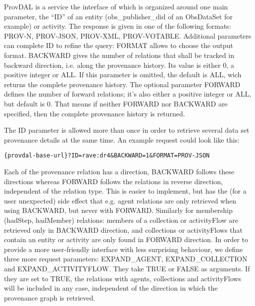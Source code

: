 ProvDAL is a service the interface of which is organized around one main parameter, the ``ID'' of an entity (obs\_publisher\_did of an ObsDataSet for example) or activity. The response is given in one of the following formats: PROV-N, PROV-JSON, PROV-XML, PROV-VOTABLE. Additional parameters can complete ID to refine the query: FORMAT allows to choose the output format. BACKWARD gives the number of relations that shall be tracked in backward direction, i.e. along the provenance history. Its value is either 0, a positive integer or ALL. If this parameter is omitted, the default is ALL, wich returns the complete provenance history.
The optional parameter FORWARD defines the number of forward relations; it's also either a positive integer or ALL, but default is 0. That means if neither FORWARD nor BACKWARD are specified, then the complete provenance history is returned.



The ID parameter is allowed more than once in order to retrieve several data set provenance details at the same time. An example request could look like this:

\begin{verbatim}
{provdal-base-url}?ID=rave:dr4&BACKWARD=1&FORMAT=PROV-JSON
\end{verbatim}

Each of the provenance relation has a direction, BACKWARD follows these directions whereas FORWARD follows the relations in reverse direction, independent of the relation type. This is easier to implement, but has the (for a user unexpected) side effect that e.g. agent relations are only retrieved when using BACKWARD, but never with FORWARD. Similarly for membership (hadStep, hadMember) relations: members of a collection or activityFlow are retrieved only in BACKWARD direction, and collections or activityFlows that contain an entity or activity are only found in FORWARD direction. In order to provide a more user-friendly interface with less surprising behaviour, we define three more request parameters: EXPAND\_AGENT, EXPAND\_COLLECTION and EXPAND\_ACTIVITYFLOW. They take TRUE or FALSE as arguments. If they are set to TRUE, the relations with agents, collections and activityFlows will be included in any case, independent of the direction in which the provenance graph is retrieved.

